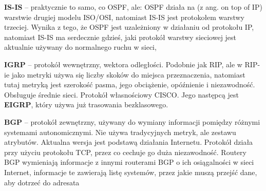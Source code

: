 \textbf{IS-IS} – praktycznie to samo, co OSPF, ale: OSPF działa na (z ang. on top of IP) warstwie drugiej modelu ISO/OSI, natomiast IS-IS jest protokołem warstwy trzeciej. Wynika z tego, że OSPF jest uzależniony w działaniu od protokołu IP, natomiast IS-IS ma serdecznie gdzieś, jaki protokół warstwy sieciowej jest aktualnie używany do normalnego ruchu w sieci,

\textbf{IGRP} – protokół wewnętrzny, wektora odległości. Podobnie jak RIP, ale w RIP-ie jako metryki używa się liczby skoków do miejsca przeznaczenia, natomiast tutaj metryką jest szerokość pasma, jego obciążenie, opóźnienie i niezawodność. Obsługuje średnie sieci. Protokół własnościowy CISCO. Jego następcą jest \textbf{EIGRP}, który używa już trasowania bezklasowego.

\textbf{BGP} – protokół zewnętrzny, używany do wymiany informacji pomiędzy różnymi systemami autonomicznymi. Nie używa tradycyjnych metryk, ale zestawu atrybutów. Aktualna wersja jest podstawą działania Internetu. Protokół działa przy użyciu protokołu TCP, przez co cechuje go duża niezawodność. Routery BGP wymieniają informacje z innymi routerami BGP o ich osiągalności w sieci Internet, informacje te zawierają listę systemów, przez jakie muszą przejść dane, aby dotrzeć do adresata